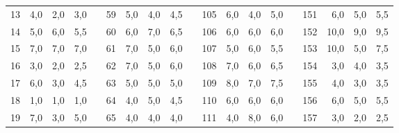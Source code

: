 \begin{table}[H]
{\begin{tabular}{|r|r|r|r|l|r|r|r|r|l|r|r|r|r|lrrrr}
13                               & 4,0                          & 2,0                          & 3,0                          &  & 59 & 5,0  & 4,0  & 4,5  &  & 105 & 6,0  & 4,0  & 5,0  & \multicolumn{1}{l|}{} & \multicolumn{1}{r|}{151} & \multicolumn{1}{r|}{6,0}  & \multicolumn{1}{r|}{5,0}  & \multicolumn{1}{r|}{5,5}  \\ \cline{1-4} \cline{6-9} \cline{11-14} \cline{16-19} 
14                               & 5,0                          & 6,0                          & 5,5                          &  & 60 & 6,0  & 7,0  & 6,5  &  & 106 & 6,0  & 6,0  & 6,0  & \multicolumn{1}{l|}{} & \multicolumn{1}{r|}{152} & \multicolumn{1}{r|}{10,0} & \multicolumn{1}{r|}{9,0}  & \multicolumn{1}{r|}{9,5}  \\ \cline{1-4} \cline{6-9} \cline{11-14} \cline{16-19} 
15                               & 7,0                          & 7,0                          & 7,0                          &  & 61 & 7,0  & 5,0  & 6,0  &  & 107 & 5,0  & 6,0  & 5,5  & \multicolumn{1}{l|}{} & \multicolumn{1}{r|}{153} & \multicolumn{1}{r|}{10,0} & \multicolumn{1}{r|}{5,0}  & \multicolumn{1}{r|}{7,5}  \\ \cline{1-4} \cline{6-9} \cline{11-14} \cline{16-19} 
16                               & 3,0                          & 2,0                          & 2,5                          &  & 62 & 7,0  & 5,0  & 6,0  &  & 108 & 7,0  & 6,0  & 6,5  & \multicolumn{1}{l|}{} & \multicolumn{1}{r|}{154} & \multicolumn{1}{r|}{3,0}  & \multicolumn{1}{r|}{4,0}  & \multicolumn{1}{r|}{3,5}  \\ \cline{1-4} \cline{6-9} \cline{11-14} \cline{16-19} 
17                               & 6,0                          & 3,0                          & 4,5                          &  & 63 & 5,0  & 5,0  & 5,0  &  & 109 & 8,0  & 7,0  & 7,5  & \multicolumn{1}{l|}{} & \multicolumn{1}{r|}{155} & \multicolumn{1}{r|}{4,0}  & \multicolumn{1}{r|}{3,0}  & \multicolumn{1}{r|}{3,5}  \\ \cline{1-4} \cline{6-9} \cline{11-14} \cline{16-19} 
18                               & 1,0                          & 1,0                          & 1,0                          &  & 64 & 4,0  & 5,0  & 4,5  &  & 110 & 6,0  & 6,0  & 6,0  & \multicolumn{1}{l|}{} & \multicolumn{1}{r|}{156} & \multicolumn{1}{r|}{6,0}  & \multicolumn{1}{r|}{5,0}  & \multicolumn{1}{r|}{5,5}  \\ \cline{1-4} \cline{6-9} \cline{11-14} \cline{16-19} 
19                               & 7,0                          & 3,0                          & 5,0                          &  & 65 & 4,0  & 4,0  & 4,0  &  & 111 & 4,0  & 8,0  & 6,0  & \multicolumn{1}{l|}{} & \multicolumn{1}{r|}{157} & \multicolumn{1}{r|}{3,0}  & \multicolumn{1}{r|}{2,0}  & \multicolumn{1}{r|}{2,5}  \\ \cline{1-4} \cline{6-9} \cline{11-14} \cline{16-19} 

\end{tabular}}
\end{table}
